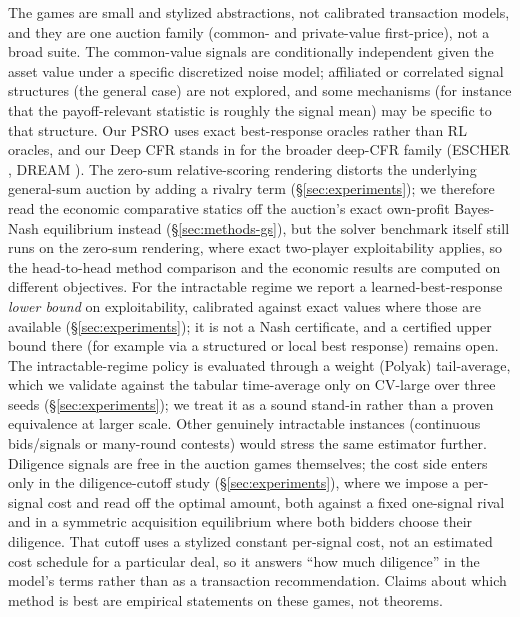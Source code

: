 \documentclass[11pt,a4paper]{article}
\begin{document}
The games are small and stylized abstractions, not calibrated transaction models,
and they are one auction family (common- and private-value first-price), not a broad
suite. The common-value signals are conditionally independent given the asset value
under a specific discretized noise model; affiliated or correlated signal structures
(the general \citealp{milgromweber1982} case) are not explored, and some mechanisms
(for instance that the payoff-relevant statistic is roughly the signal mean) may be
specific to that structure. Our PSRO uses exact best-response oracles rather than RL oracles, and our Deep
CFR stands in for the broader deep-CFR family (ESCHER \citealp{escher2022}, DREAM
\citealp{dream2020}). The zero-sum relative-scoring rendering distorts the underlying
general-sum auction by adding a rivalry term (\S\ref{sec:experiments}); we therefore
read the economic comparative statics off the auction's exact own-profit Bayes-Nash
equilibrium instead (\S\ref{sec:methods-gs}), but the solver benchmark itself still runs
on the zero-sum rendering, where exact two-player exploitability applies, so the
head-to-head method comparison and the economic results are computed on different
objectives. For the intractable regime we report a learned-best-response \emph{lower
bound} on
exploitability, calibrated against exact values where those are available
(\S\ref{sec:experiments}); it is not a Nash certificate, and a certified upper bound
there (for example via a structured or local best response) remains open. The
intractable-regime policy is evaluated through a weight (Polyak) tail-average, which we
validate against the tabular time-average only on CV-large over three seeds
(\S\ref{sec:experiments}); we treat it as a sound stand-in rather than a proven
equivalence at larger scale. Other genuinely intractable instances (continuous
bids/signals or many-round contests) would stress the same estimator further.
Diligence signals are free in the auction games themselves; the cost side enters only
in the diligence-cutoff study (\S\ref{sec:experiments}), where we impose a per-signal
cost and read off the optimal amount, both against a fixed one-signal rival and in a
symmetric acquisition equilibrium where both bidders choose their diligence. That cutoff
uses a stylized constant per-signal cost, not an estimated cost schedule for a particular
deal, so it answers ``how much diligence'' in the model's terms rather than as a
transaction recommendation. Claims about which method is best are empirical statements on these
games, not theorems.
\end{document}
